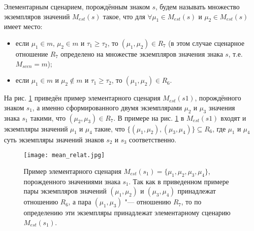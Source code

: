 Элементарным сценарием, порождённым знаком $s$, будем называть множество экземпляров значений $M_{est}(s)$ такое, что для $\forall\mu_1\in M_{est}(s)$ и $\mu_2\in M_{est}(s)$ имеет место:
\begin{itemize}
	\item если $\mu_1\in m$, $\mu_2\in m$ и $\tau_1\geqslant\tau_2$, то $(\mu_1,\mu_2)\in R_7$ (в этом случае сценарное отношение $R_7$ определено на множестве экземпляров значения знака $s$, т.е. $M_{scen}=m$);
	\item если $\mu_1\in m$ и $\mu_2\not\in m$ и $\tau_1\geqslant\tau_2$, то $(\mu_1,\mu_2)\in R_6$.
\end{itemize}

На рис. \ref{fg:mean_relat} приведён пример элементарного сценария $M_{est}(s1)$, порождённого знаком $s_1$, а именно сформированного двумя экземплярами $\mu_2$ и $\mu_3$ значения знака $s_1$ такими, что $(\mu_2,\mu_3)\in R_7$. В примере на рис. \ref{fg:mean_relat} в $M_{est}(s1)$ входят и экземпляры значений $\mu_1$ и $\mu_4$ такие, что $\{(\mu_1,\mu_2),(\mu_3,\mu_4)\}\subseteq R_6$, где $\mu_1$ и $\mu_4$ суть экземпляры значений знаков $s_2$ и $s_3$ соответственно.

\begin{figure}[h]
	\centering
	\texttt{[image: mean\_relat.jpg]}
	\caption{Пример элементарного сценария $M_{est}(s_1)=\{\mu_1,\mu_2,\mu_3,\mu_4\}$, порожденного значениями знака $s_1$. Так как в приведенном примере пары экземпляров значений $(\mu_1,\mu_2)$ и $(\mu_3,\mu_4)$ принадлежат отношению $R_6$, а пара $(\mu_1,\mu_3)$ "--- отношению $R_7$, то по определению эти экземпляры принадлежат элементарному сценарию $M_{est}(s_1)$.}
	\label{fg:mean_relat}
\end{figure}


\clearpage